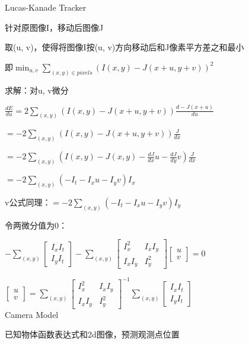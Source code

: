 \documentclass[UTF8]{ctexart}
\begin{document}
  Lucas-Kanade Tracker

  \quad 针对原图像I，移动后图像J

  \quad 取(u, v)，使得将图像I按(u, v)方向移动后和J像素平方差之和最小

  \quad \quad 即$\min_{u, v}\sum_{(x, y) \in pixels}(I(x, y) - J(x + u, y + v))^2$

  \quad 求解：对u, v微分

  \quad \quad $\frac{dE}{du} = 2\sum_{(x, y)}(I(x, y) - J(x + u, y  + v))\frac{d-J(x + u)}{du}$

  \quad \quad \quad $ = -2\sum_{(x, y)}(I(x, y) - J(x + u, y  + v))\frac{J}{dx}$

  \quad \quad \quad $ = -2\sum_{(x, y)}(I(x, y) - J(x, y) - \frac{dJ}{dx}u - \frac{dJ}{dy}v)\frac{J}{dx}$

  \quad \quad \quad $ = -2\sum_{(x, y)}(-I_t - I_xu - I_yv)I_x$

  \quad \quad \quad v公式同理：$ = -2\sum_{(x, y)}(-I_t - I_xu - I_yv)I_y$

  \quad \quad 令两微分值为0：

  \quad \quad \quad $-\sum_{(x, y)}
    \begin{bmatrix}
      I_xI_t \\
      I_yI_t
      \end{bmatrix} - \sum_{(x, y)}
    \begin{bmatrix}
      I_x^2 & I_xI_y \\
      I_xI_y & I_y^2
      \end{bmatrix}
    \begin{bmatrix}
      u \\
      v
      \end{bmatrix}
    = 0$

  \quad \quad \quad $
    \begin{bmatrix}
      u \\
      v
      \end{bmatrix}
    = 
    \sum_{(x, y)}
    \begin{bmatrix}
      I_x^2 & I_xI_y \\
      I_xI_y & I_y^2
      \end{bmatrix}^{-1}
    \sum_{(x, y)}
    \begin{bmatrix}
      I_xI_t \\
      I_yI_t
      \end{bmatrix}$\\
Camera Model 

  已知物体函数表达式和2d图像，预测观测点位置
\end{document}

